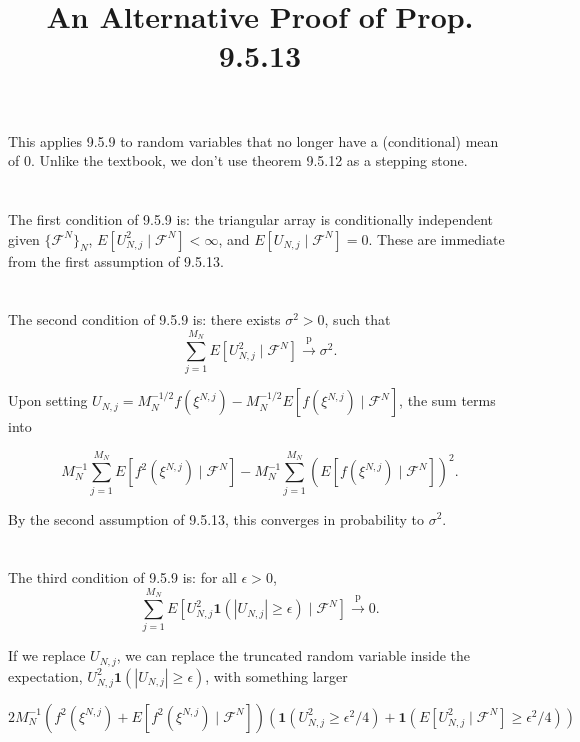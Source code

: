 \documentclass{article}
\title{An Alternative Proof of Prop. 9.5.13}
\begin{document}
\maketitle

This applies 9.5.9 to random variables that no longer have a (conditional) mean of $0$. Unlike the textbook, we don't use theorem 9.5.12 as a stepping stone. 



\section{}
The first condition of 9.5.9 is: the triangular array is conditionally independent given $\{\mathcal{F}^N\}_N$, $E[U_{N,j}^2 \mid \mathcal{F}^N] < \infty$, and $E[U_{N,j} \mid \mathcal{F}^N] = 0$. These are immediate from the first assumption of 9.5.13.

\section{}
The second condition of 9.5.9 is: there exists $\sigma^2 > 0$, such that 
$$
\sum_{j=1}^{M_N} E[U_{N,j}^2 \mid \mathcal{F}^N] \overset{\text{p}}{\to} \sigma^2.
$$

Upon setting $U_{N,j} = M_N^{-1/2}f(\xi^{N,j}) - M_N^{-1/2}E[f(\xi^{N,j}) \mid \mathcal{F}^N]$, the sum terms into

$$
M_N^{-1} \sum_{j=1}^{M_N} E[ f^2(\xi^{N,j})  \mid \mathcal{F}^N] - M_N^{-1} \sum_{j=1}^{M_N}\left( E[f(\xi^{N,j}) \mid \mathcal{F}^N] \right)^2.
$$

By the second assumption of 9.5.13, this converges in probability to $\sigma^2$.


\section{}

The third condition of 9.5.9 is: for all $\epsilon> 0$, 
$$
\sum_{j=1}^{M_N} E[U_{N,j}^2 \mathbf{1}\left( |U_{N,j}| \ge \epsilon \right) \mid \mathcal{F}^N] \overset{\text{p}}{\to} 0.
$$

If we replace $U_{N,j}$, we can replace the truncated random variable inside the expectation, $U_{N,j}^2 \mathbf{1}\left( |U_{N,j}| \ge \epsilon \right)$, with something larger

$$
2 M_N^{-1} \left(f^2(\xi^{N,j}) + E[f^2(\xi^{N,j}) \mid \mathcal{F}^N ] \right) \left(\mathbf{1}\left( U^2_{N,j} \ge \epsilon^2/4 \right) + \mathbf{1}\left( E[U_{N,j}^2 \mid \mathcal{F}^N] \ge \epsilon^2/4 \right)  \right)
$$
\end{document}
